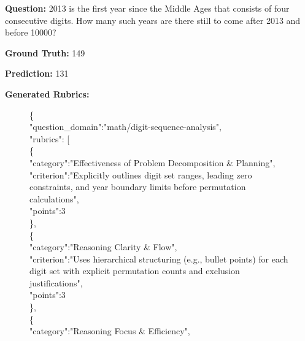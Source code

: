 \textbf{Question:}
2013 is the first year since the Middle Ages that consists of four consecutive digits. How many such years are there still to come after 2013 and before 10000?

\textbf{Ground Truth:}
149

\textbf{Prediction:}
131



\textbf{Generated Rubrics:}
\begin{figure}[!ht]
    \centering
    \begin{lrbox}{\DSRPrompt}
    \begin{promptbox}
    \raggedright
    \scriptsize\ttfamily
\setlength{\baselineskip}{1\baselineskip}
\{\\
\hspace{2em}"question\_domain":"math/digit-sequence-analysis",\\
\hspace{2em}"rubrics": [\\
\hspace{4em}\{\\
\hspace{6em}"category":"Effectiveness of Problem Decomposition \& Planning",\\
\hspace{6em}"criterion":"Explicitly outlines digit set ranges, leading zero constraints, and year boundary limits before permutation calculations",\\
\hspace{6em}"points":3\\
\hspace{4em}\},\\
\hspace{4em}\{\\
\hspace{6em}"category":"Reasoning Clarity \& Flow",\\
\hspace{6em}"criterion":"Uses hierarchical structuring (e.g., bullet points) for each digit set with explicit permutation counts and exclusion justifications",\\
\hspace{6em}"points":3\\
\hspace{4em}\},\\
\hspace{4em}\{\\
\hspace{6em}"category":"Reasoning Focus \& Efficiency",\\

\end{promptbox}
\end{lrbox}
\end{figure}
